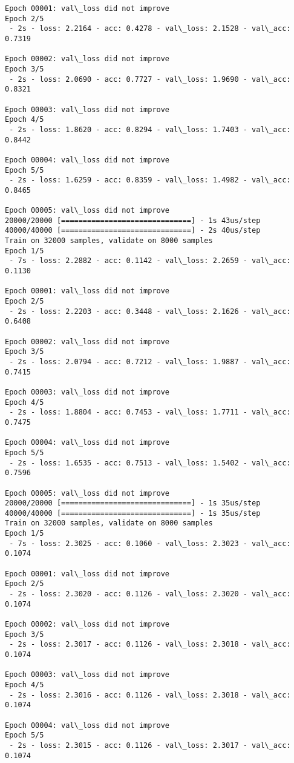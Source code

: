 \documentclass[11pt]{article}
\begin{document}
\begin{Verbatim}[commandchars=\\\{\}]
Epoch 00001: val\_loss did not improve
Epoch 2/5
 - 2s - loss: 2.2164 - acc: 0.4278 - val\_loss: 2.1528 - val\_acc: 0.7319

Epoch 00002: val\_loss did not improve
Epoch 3/5
 - 2s - loss: 2.0690 - acc: 0.7727 - val\_loss: 1.9690 - val\_acc: 0.8321

Epoch 00003: val\_loss did not improve
Epoch 4/5
 - 2s - loss: 1.8620 - acc: 0.8294 - val\_loss: 1.7403 - val\_acc: 0.8442

Epoch 00004: val\_loss did not improve
Epoch 5/5
 - 2s - loss: 1.6259 - acc: 0.8359 - val\_loss: 1.4982 - val\_acc: 0.8465

Epoch 00005: val\_loss did not improve
20000/20000 [==============================] - 1s 43us/step
40000/40000 [==============================] - 2s 40us/step
Train on 32000 samples, validate on 8000 samples
Epoch 1/5
 - 7s - loss: 2.2882 - acc: 0.1142 - val\_loss: 2.2659 - val\_acc: 0.1130

Epoch 00001: val\_loss did not improve
Epoch 2/5
 - 2s - loss: 2.2203 - acc: 0.3448 - val\_loss: 2.1626 - val\_acc: 0.6408

Epoch 00002: val\_loss did not improve
Epoch 3/5
 - 2s - loss: 2.0794 - acc: 0.7212 - val\_loss: 1.9887 - val\_acc: 0.7415

Epoch 00003: val\_loss did not improve
Epoch 4/5
 - 2s - loss: 1.8804 - acc: 0.7453 - val\_loss: 1.7711 - val\_acc: 0.7475

Epoch 00004: val\_loss did not improve
Epoch 5/5
 - 2s - loss: 1.6535 - acc: 0.7513 - val\_loss: 1.5402 - val\_acc: 0.7596

Epoch 00005: val\_loss did not improve
20000/20000 [==============================] - 1s 35us/step
40000/40000 [==============================] - 1s 35us/step
Train on 32000 samples, validate on 8000 samples
Epoch 1/5
 - 7s - loss: 2.3025 - acc: 0.1060 - val\_loss: 2.3023 - val\_acc: 0.1074

Epoch 00001: val\_loss did not improve
Epoch 2/5
 - 2s - loss: 2.3020 - acc: 0.1126 - val\_loss: 2.3020 - val\_acc: 0.1074

Epoch 00002: val\_loss did not improve
Epoch 3/5
 - 2s - loss: 2.3017 - acc: 0.1126 - val\_loss: 2.3018 - val\_acc: 0.1074

Epoch 00003: val\_loss did not improve
Epoch 4/5
 - 2s - loss: 2.3016 - acc: 0.1126 - val\_loss: 2.3018 - val\_acc: 0.1074

Epoch 00004: val\_loss did not improve
Epoch 5/5
 - 2s - loss: 2.3015 - acc: 0.1126 - val\_loss: 2.3017 - val\_acc: 0.1074


\end{Verbatim}
\end{document}
